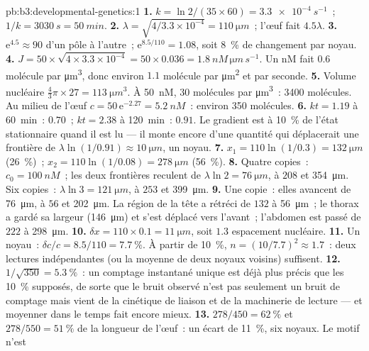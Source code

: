 \begin{solution}{pb:b3:developmental-genetics:1}
\textbf{1.} $k = \ln 2/(35\times 60) = \qty{3.3e-4}{s^{-1}}$~; $1/k =
\qty{3030}{s} = \qty{50}{min}$.
\textbf{2.} $\lambda = \sqrt{4/3.3\times 10^{-4}} = \qty{110}{\micro m}$~;
l'œuf fait $4.5\lambda$.
\textbf{3.} $\mathrm{e}^{4.5} \approx 90$ d'un pôle à l'autre~;
$\mathrm{e}^{8.5/110} = 1.08$, soit \qty{8}{\%} de changement par noyau.
\textbf{4.} $J = 50\times\sqrt{4\times 3.3\times 10^{-4}} = 50\times
0.036 = \qty{1.8}{nM\,\micro m\,s^{-1}}$. Un nM fait $0.6$ molécule
par \unit{\micro m^3}, donc environ $1.1$ molécule par \unit{\micro m^2}
et par seconde.
\textbf{5.} Volume nucléaire $\tfrac{4}{3}\pi\times 27 = \qty{113}{\micro
m^3}$. À \qty{50}{nM}, $30$ molécules par \unit{\micro m^3}~:
\num{3400} molécules. Au milieu de l'œuf $c = 50\,\mathrm{e}^{-2.27} =
\qty{5.2}{nM}$~: environ \num{350} molécules.
\textbf{6.} $kt = 1.19$ à \qty{60}{min}~: $0.70$~; $kt = 2.38$ à
\qty{120}{min}~: $0.91$. Le gradient est à \qty{10}{\%} de l'état
stationnaire quand il est lu --- il monte encore d'une quantité qui
déplacerait une frontière de $\lambda\ln(1/0.91) \approx \qty{10}{\micro m}$,
un noyau.
\textbf{7.} $x_{1} = 110\ln(1/0.3) = \qty{132}{\micro m}$
(\qty{26}{\%})~; $x_{2} = 110\ln(1/0.08) = \qty{278}{\micro m}$
(\qty{56}{\%}).
\textbf{8.} Quatre copies~: $c_{0} = \qty{100}{nM}$~; les deux frontières
reculent de $\lambda\ln 2 = \qty{76}{\micro m}$, à $208$ et
\qty{354}{\micro m}. Six copies~: $\lambda\ln 3 = \qty{121}{\micro m}$,
à $253$ et \qty{399}{\micro m}.
\textbf{9.} Une copie~: elles avancent de \qty{76}{\micro m}, à $56$ et
\qty{202}{\micro m}. La région de la tête a rétréci de $132$ à
\qty{56}{\micro m}~; le thorax a gardé sa largeur (\qty{146}{\micro m}) et
s'est déplacé vers l'avant~; l'abdomen est passé de $222$ à \qty{298}{\micro m}.
\textbf{10.} $\delta x = 110\times 0.1 = \qty{11}{\micro m}$, soit $1.3$
espacement nucléaire.
\textbf{11.} Un noyau~: $\delta c/c = 8.5/110 = \qty{7.7}{\%}$. À partir
de \qty{10}{\%}, $n = (10/7.7)^{2} \approx 1.7$~: deux lectures
indépendantes (ou la moyenne de deux noyaux voisins) suffisent.
\textbf{12.} $1/\sqrt{350} = \qty{5.3}{\%}$~: un comptage instantané
unique est déjà plus précis que les \qty{10}{\%} supposés, de sorte que
le bruit observé n'est pas seulement un bruit de comptage mais vient de
la cinétique de liaison et de la machinerie de lecture --- et moyenner
dans le temps fait encore mieux.
\textbf{13.} $278/450 = \qty{62}{\%}$ et $278/550 = \qty{51}{\%}$ de la
longueur de l'œuf~: un écart de \qty{11}{\%}, six noyaux. Le motif n'est

\end{solution}

